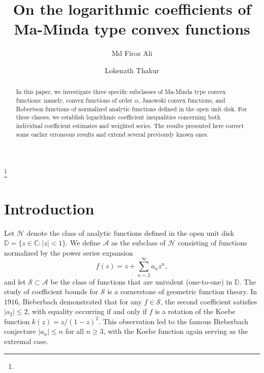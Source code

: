 \documentclass[a4paper,12pt]{amsart}
\theoremstyle{definition}
\newcounter{minutes}\setcounter{minutes}{\time}
\newcounter{hours}\setcounter{hours}{\time}
\newcounter {own}
\begin{document}
\title{ On the logarithmic coefficients of Ma-Minda type convex functions}

\author{Md Firoz Ali}
\address{Md Firoz Ali,
 National Institute Of Technology Durgapur, West Bengal, India}

\author{Lokenath Thakur}
\address{Lokenath Thakur, National Institute Of Technology Durgapur, West Bengal, India}




\def\thefootnote{}
 \makeatletter\def\thefootnote{\@arabic\c@footnote}\makeatother


\begin{abstract}
In this paper, we investigate three specific subclasses of Ma-Minda type convex functions: namely, convex functions of order $\alpha$, Janowski convex functions, and Robertson functions of normalized analytic functions defined in the open unit disk.
For these classes, we establish logarithmic coefficient inequalities concerning both individual coefficient estimates and weighted series. The results presented here correct some earlier erroneous results and extend several previously known ones.
\end{abstract}
\thanks{}

\maketitle
\pagestyle{myheadings}



\section{Introduction}
Let $\mathcal{H}$ denote the class of analytic functions defined in the open unit disk $\mathbb{D} = \{z \in \mathbb{C} : |z| < 1\}$. We define $\mathcal{A}$ as the subclass of $\mathcal{H}$ consisting of functions normalized by the power series expansion
\begin{equation}\label{T-05}
f(z) = z + \sum_{n=2}^\infty a_n z^n,
\end{equation}
and let $\mathcal{S} \subset \mathcal{A}$ be the class of functions that are univalent (one-to-one) in $\mathbb{D}$.
The study of coefficient bounds for $\mathcal{S}$ is a cornerstone of geometric function theory. In $1916$, Bieberbach \cite{1916-Bieberbach} demonstrated that for any $f \in \mathcal{S}$, the second coefficient satisfies $|a_2| \le 2$, with equality occurring if and only if $f$ is a rotation of the Koebe function $k(z) = z/(1-z)^2$. This observation led to the famous Bieberbach conjecture $|a_n| \le n$ for all $n \ge 3$, with the Koebe function again serving as the extremal case.\\
\end{document}
